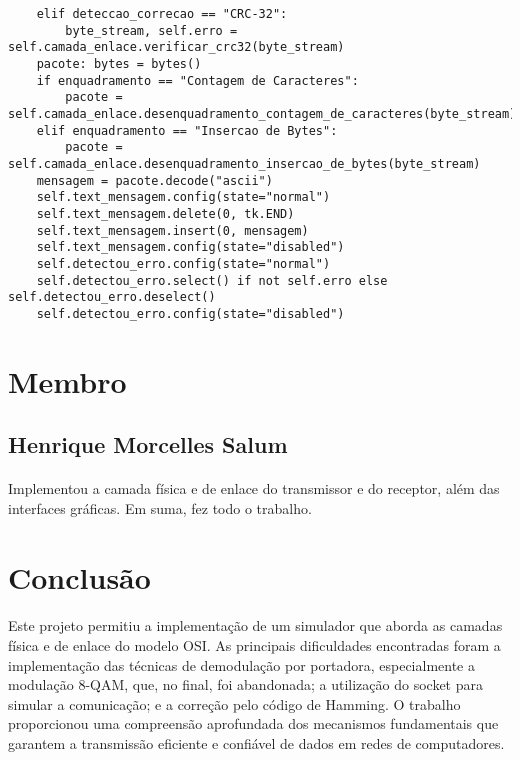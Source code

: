 \documentclass[12pt, a4paper]{article}
\newenvironment{code}{\captionsetup{type=listing}}{}
\begin{document}
\begin{code}
\begin{verbatim}
    elif deteccao_correcao == "CRC-32":
        byte_stream, self.erro = self.camada_enlace.verificar_crc32(byte_stream)
    pacote: bytes = bytes()
    if enquadramento == "Contagem de Caracteres":
        pacote = self.camada_enlace.desenquadramento_contagem_de_caracteres(byte_stream)
    elif enquadramento == "Insercao de Bytes":
        pacote = self.camada_enlace.desenquadramento_insercao_de_bytes(byte_stream)
    mensagem = pacote.decode("ascii")
    self.text_mensagem.config(state="normal")
    self.text_mensagem.delete(0, tk.END)
    self.text_mensagem.insert(0, mensagem)
    self.text_mensagem.config(state="disabled")
    self.detectou_erro.config(state="normal")
    self.detectou_erro.select() if not self.erro else self.detectou_erro.deselect()
    self.detectou_erro.config(state="disabled")
\end{verbatim}
\end{code}

\section{Membro}
\subsection{Henrique Morcelles Salum}
\paragraph{}
Implementou a camada física e de enlace do transmissor e do receptor, além das interfaces gráficas. Em suma, fez todo o trabalho.

\section{Conclusão}
\paragraph{}
Este projeto permitiu a implementação de um simulador que aborda as camadas física e de enlace do modelo OSI. As principais dificuldades encontradas foram a implementação das técnicas de demodulação por portadora, especialmente a modulação 8-QAM, que, no final, foi abandonada; a utilização do socket para simular a comunicação; e a correção pelo código de Hamming. O trabalho proporcionou uma compreensão aprofundada dos mecanismos fundamentais que garantem a transmissão eficiente e confiável de dados em redes de computadores.
\end{document}
